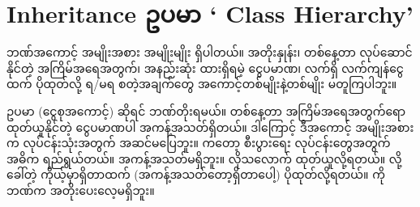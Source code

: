  


\section{Inheritance ဥပမာ ‘ Class Hierarchy’}
ဘဏ်အကောင့် အမျိုးအစား အမျိုးမျိုး ရှိပါတယ်။ အတိုးနှုန်း၊ တစ်နေ့တာ လုပ်ဆောင်နိုင်တဲ့  အကြိမ်အရေအတွက်၊ အနည်းဆုံး ထားရှိရမဲ့ ငွေပမာဏ၊ လက်ရှိ လက်ကျန်ငွေထက် ပိုထုတ်လို့ ရ/မရ  စတဲ့အချက်တွေ အကောင့်တစ်မျိုးနဲ့တစ်မျိုး မတူကြပါဘူး။ 

ဥပမာ  (ငွေစုအကောင့်) ဆိုရင် ဘဏ်တိုးရမယ်။ တစ်နေ့တာ  အကြိမ်အရေအတွက်ရော ထုတ်ယူနိုင်တဲ့ ငွေပမာဏပါ အကန့်အသတ်ရှိတယ်။ ဒါကြောင့် ဒီအကောင့် အမျိုးအစားက လုပ်ငန်းသုံးအတွက် အဆင်မပြေဘူး။    ကတော့ စီးပွားရေး လုပ်ငန်းတွေအတွက် အဓိက ရည်ရွယ်တယ်။  အကန့်အသတ်မရှိဘူး။ လိုသလောက် ထုတ်ယူလို့ရတယ်။  လို့ခေါ်တဲ့ ကိုယ့်မှာရှိတာထက် (အကန့်အသတ်တော့ရှိတာပေါ့) ပိုထုတ်လို့ရတယ်။  ကို ဘဏ်က အတိုးပေးလေ့မရှိဘူး။ 

